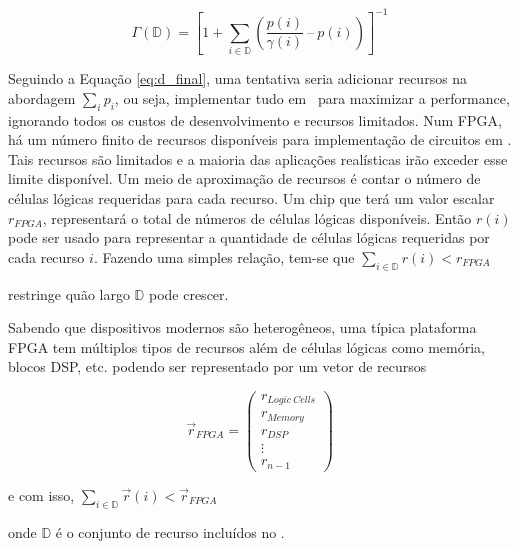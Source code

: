 	\begin{equation}
    	\Gamma (\mathbb{D}) =
        \left [
        	1 + \sum _{i \in \mathbb{D}} \left (
            	\frac{
                	p(i)
                }{
                	\gamma(i)
                } \ – \ p(i)
                \right)
        \right ]^{-1} \label{eq:d_final}
    \end{equation}

		Seguindo a Equação \ref{eq:d_final}, uma tentativa seria adicionar recursos na abordagem $\sum_i p_i$, ou seja,  implementar tudo em \hardware\ para maximizar a performance, ignorando todos os custos de desenvolvimento e recursos limitados.
		Num FPGA, há um número finito de recursos disponíveis para implementação de circuitos em \hardware. Tais recursos são limitados e a maioria das aplicações realísticas irão exceder esse limite disponível.
		Um meio de aproximação de recursos é contar o número de células lógicas requeridas para cada recurso. Um chip que terá um valor escalar $ r_{FPGA} $, representará o total de números de células lógicas disponíveis. Então $ r(i) $ pode ser usado para representar a quantidade de células lógicas requeridas por cada recurso $ i $. Fazendo uma simples relação, tem-se que $ \sum_{i \in \mathbb{D}} r(i) < r_{FPGA} $ 

		restringe quão largo $ \mathbb{D} $ pode crescer.

		Sabendo que dispositivos modernos são heterogêneos, uma típica plataforma FPGA tem múltiplos tipos de recursos além de células lógicas como memória, blocos DSP, etc. podendo ser representado por um vetor de recursos

		\begin{equation}
			\vec{r}_{FPGA} =
				\begin{pmatrix}
				r_{Logic\ Cells} \\
				r_{Memory}\\
				r_{DSP}\\
				\vdots \\
				r_{n-1}
				\end{pmatrix}
		\end{equation}

		e com isso, $\sum_{i \in \mathbb{D}} \vec{r}(i) < \vec{r}_{FPGA}$

		onde $ \mathbb{D} $ é o conjunto de recurso incluídos no \design.

